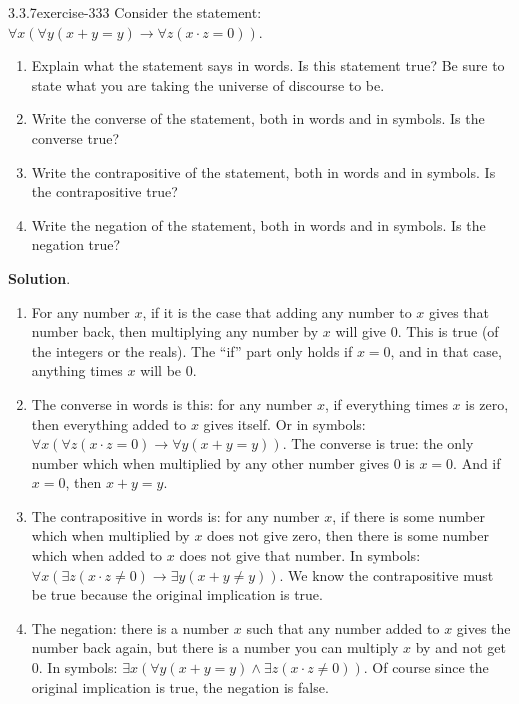 \documentclass[twoside,11pt,]{book}
\numberwithin{equation}{chapter}
\newcommand{\imp}{\rightarrow}
\begin{document}
\begin{divisionsolution}{3.3.7}{}{exercise-333}%
\hypertarget{p-4276}{}%
Consider the statement: \(\forall x (\forall y (x + y = y) \imp \forall z (x\cdot z = 0))\).\leavevmode%
\begin{enumerate}[label=(\alph*)]
\item\hypertarget{li-2176}{}\hypertarget{p-4277}{}%
Explain what the statement says in words. Is this statement true? Be sure to state what you are taking the universe of discourse to be.%
\item\hypertarget{li-2177}{}\hypertarget{p-4278}{}%
Write the converse of the statement, both in words and in symbols. Is the converse true?%
\item\hypertarget{li-2178}{}\hypertarget{p-4279}{}%
Write the contrapositive of the statement, both in words and in symbols. Is the contrapositive true?%
\item\hypertarget{li-2179}{}\hypertarget{p-4280}{}%
Write the negation of the statement, both in words and in symbols. Is the negation true?%
\end{enumerate}
%
\par\smallskip%
\noindent\textbf{Solution}.\quad%
\hypertarget{p-4281}{}%
\leavevmode%
\begin{enumerate}[label=(\alph*)]
\item\hypertarget{li-2180}{}\hypertarget{p-4282}{}%
For any number \(x\), if it is the case that adding any number to \(x\) gives that number back, then multiplying any number by \(x\) will give 0. This is true (of the integers or the reals). The ``if'' part only holds if \(x = 0\), and in that case, anything times \(x\) will be 0.%
\item\hypertarget{li-2181}{}\hypertarget{p-4283}{}%
The converse in words is this: for any number \(x\), if everything times \(x\) is zero, then everything added to \(x\) gives itself. Or in symbols: \(\forall x (\forall z (x \cdot z = 0) \imp \forall y (x + y = y))\). The converse is true: the only number which when multiplied by any other number gives 0 is \(x = 0\). And if \(x = 0\), then \(x + y = y\).%
\item\hypertarget{li-2182}{}\hypertarget{p-4284}{}%
The contrapositive in words is: for any number \(x\), if there is some number which when multiplied by \(x\) does not give zero, then there is some number which when added to \(x\) does not give that number. In symbols: \(\forall x (\exists z (x\cdot z \ne 0) \imp \exists y (x + y \ne y))\). We know the contrapositive must be true because the original implication is true.%
\item\hypertarget{li-2183}{}\hypertarget{p-4285}{}%
The negation: there is a number \(x\) such that any number added to \(x\) gives the number back again, but there is a number you can multiply \(x\) by and not get 0. In symbols: \(\exists x (\forall y (x + y = y) \wedge \exists z (x \cdot z \ne 0))\). Of course since the original implication is true, the negation is false.%
\end{enumerate}
%
\end{divisionsolution}%
\end{document}
